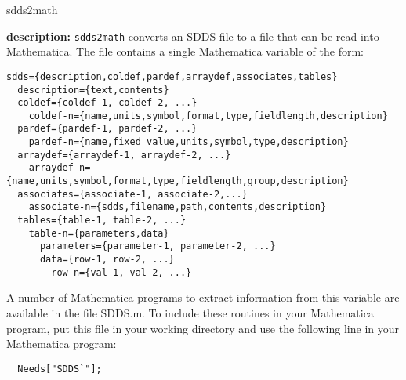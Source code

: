 \newpage
\begin{sddsprog}{sdds2math}
  \item \textbf{description:}
  \verb|sdds2math| converts an SDDS file to a file that can be read into Mathematica.
  The file contains a single Mathematica variable of the form:
 
\begin{verbatim} 
sdds={description,coldef,pardef,arraydef,associates,tables} 
  description={text,contents} 
  coldef={coldef-1, coldef-2, ...} 
    coldef-n={name,units,symbol,format,type,fieldlength,description} 
  pardef={pardef-1, pardef-2, ...} 
    pardef-n={name,fixed_value,units,symbol,type,description} 
  arraydef={arraydef-1, arraydef-2, ...} 
    arraydef-n={name,units,symbol,format,type,fieldlength,group,description} 
  associates={associate-1, associate-2,...} 
    associate-n={sdds,filename,path,contents,description} 
  tables={table-1, table-2, ...} 
    table-n={parameters,data} 
      parameters={parameter-1, parameter-2, ...} 
      data={row-1, row-2, ...} 
        row-n={val-1, val-2, ...} 
\end{verbatim}

  A number of Mathematica programs to extract information from this
  variable are available in the file SDDS.m. To include these routines
  in your Mathematica program, put this file in your working directory
  and use the following line in your Mathematica program:
  \begin{verbatim}
  Needs["SDDS`"];
  \end{verbatim}


\end{sddsprog}
